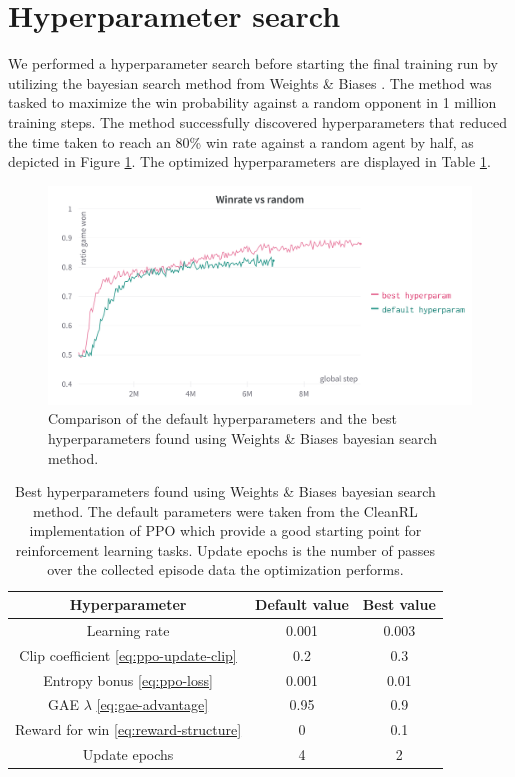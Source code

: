 \section{Hyperparameter search}
We performed a hyperparameter search before starting the final training run by utilizing the bayesian search method from Weights \& Biases \cite{wandb}. The method was tasked to maximize the win probability against a random opponent in 1 million training steps. The method successfully discovered hyperparameters that reduced the time taken to reach an 80\% win rate against a random agent by half, as depicted in Figure \ref{fig:hyperparam-best-default}. The optimized hyperparameters are displayed in Table \ref{tab:hyperparam-best}.

\begin{figure}[H]
    \centering
    \includegraphics[width=\textwidth]{images/hyperparam-best-default.png}
    \caption{Comparison of the default hyperparameters and the best hyperparameters found using Weights \& Biases bayesian search method.}
    \label{fig:hyperparam-best-default}
\end{figure}

\begin{table}[H]
    \centering
    \begin{tabular}{ccc}
        \hline
        Hyperparameter & Default value & Best value \\
        \hline
        Learning rate & 0.001 & 0.003 \\
        Clip coefficient \eqref{eq:ppo-update-clip} & 0.2 & 0.3\\
        Entropy bonus \eqref{eq:ppo-loss} & 0.001 & 0.01 \\
        GAE $\lambda$ \eqref{eq:gae-advantage} & 0.95 & 0.9 \\
        Reward for win \eqref{eq:reward-structure} & 0 & 0.1 \\
        Update epochs & 4 & 2 \\
    \end{tabular}
    \caption{Best hyperparameters found using Weights \& Biases bayesian search method. The default parameters were taken from the CleanRL implementation of PPO \cite{huang2022cleanrl} which provide a good starting point for reinforcement learning tasks. Update epochs is the number of passes over the collected episode data the optimization performs.}
    \label{tab:hyperparam-best}
\end{table}


